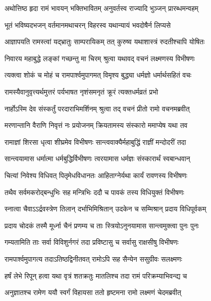 \twolineshloka
{अथोत्तिष्ठ हृदा रामं भावयन् भक्तिभावितम्}
{अनुवर्तस्व राज्यादि भुञ्जन् प्रारब्धमन्वहम्} %

\twolineshloka
{भूतं भविष्यदभजन् वर्तमानमथाचरन्}
{विहरस्व यथान्यायं भवदोषैर्न लिप्यसे} %

\twolineshloka
{आज्ञापयति रामस्त्वां यद्भ्रातुः साम्परायिकम्}
{तत् कुरुष्व यथाशास्त्रं रुदतीश्चापि योषितः} %

\twolineshloka
{निवारय महाबुद्धे लङ्कां गच्छन्तु मा चिरम्}
{श्रुत्वा यथावद् वचनं लक्ष्मणस्य विभीषणः} %

\twolineshloka
{त्यक्त्वा शोकं च मोहं च रामपार्श्वमुपागमत्}
{विमृश्य बुद्ध्या धर्मज्ञो धर्मार्थसहितं वचः} %

\twolineshloka
{रामस्यैवानुवृत्त्यर्थमुत्तरं पर्यभाषत}
{नृशंसमनृतं क्रूरं त्यक्तधर्मव्रतं प्रभो} %

\twolineshloka
{नार्होऽस्मि देव संस्कर्तुं परदाराभिमर्शिनम्}
{श्रुत्वा तद् वचनं प्रीतो रामो वचनमब्रवीत्} %

\twolineshloka
{मरणान्तानि वैराणि निवृत्तं नः प्रयोजनम्}
{क्रियतामस्य संस्कारो ममाप्येष यथा तव} %

\twolineshloka
{रामाज्ञां शिरसा धृत्वा शीघ्रमेव विभीषणः}
{सान्त्ववाक्यैर्महाबुद्धिं राज्ञीं मन्दोदरीं तदा} %

\twolineshloka
{सान्त्वयामास धर्मात्मा धर्मबुद्धिर्विभीषणः}
{त्वरयामास धर्मज्ञः संस्कारार्थं स्वबान्धवान्} %

\twolineshloka
{चित्यां निवेश्य विधिवत् पितृमेधविधानतः}
{आहिताग्नेर्यथा कार्यं रावणस्य विभीषणः} %

\twolineshloka
{तथैव सर्वमकरोद्बन्धुभिः सह मन्त्रिभिः}
{ददौ च पावकं तस्य विधियुक्तं विभीषणः} %

\twolineshloka
{स्नात्वा चैवाऽऽर्द्रवस्त्रेण तिलान् दर्भाभिमिश्रितान्}
{उदकेन च सम्मिश्रान् प्रदाय विधिपूर्वकम्} %

\twolineshloka
{प्रदाय चोदकं तस्मै मूर्ध्ना चैनं प्रणम्य च}
{ताः स्त्रियोऽनुनयामास सान्त्वमुक्त्वा पुनः पुनः} %

\twolineshloka
{गम्यतामिति ताः सर्वा विविशुर्नगरं तदा}
{प्रविष्टासु च सर्वासु राक्षसीषु विभीषणः} %

\twolineshloka
{रामपार्श्वमुपागत्य तदाऽतिष्ठद्विनीतवत्}
{रामोऽपि सह सैन्येन ससुग्रीवः सलक्ष्मणः} %

\twolineshloka
{हर्षं लेभे रिपून् हत्वा यथा वृत्रं शतक्रतुः}
{मातलिश्च तदा रामं परिक्रम्याभिवन्द्य च} %

\twolineshloka
{अनुज्ञातश्च रामेण ययौ स्वर्गं विहायसा}
{ततो हृष्टमना रामो लक्ष्मणं चेदमब्रवीत्} %

